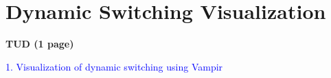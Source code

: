 \section{Dynamic Switching Visualization} \label{switching-visualization}
\textbf{TUD (1 page)}

\textcolor{blue}{1. Visualization of dynamic switching using Vampir}
